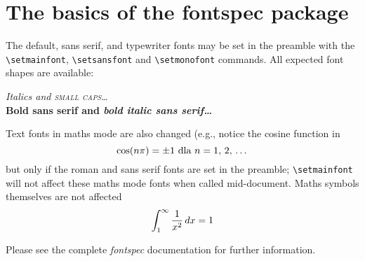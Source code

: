 \documentclass[a4paper,12pt]{article}
\begin{document}
\pagestyle{empty}

\section*{The basics of the \textsf{fontspec} package}

The default, sans serif, and typewriter fonts may be set in the preamble
with the \verb|\setmainfont|, \verb|\setsansfont| and \verb|\setmonofont|
commands.
All expected font shapes are available:
\begin{center}
  {\itshape Italics and \scshape small caps\dots}\\
  {\sffamily\bfseries Bold sans serif and \itshape bold italic sans serif\dots}
\end{center}
Text fonts in maths mode are also changed (e.g., notice the cosine function in
$$
  \cos(n\pi)=\pm 1 \hbox{ dla $n=1$, $2$, \ldots}
$$
but only if the roman and sans serif fonts are set in
the preamble; \verb|\setmainfont| will not affect these maths mode fonts when
called mid-document.
Maths symbols themselves are not affected
$$
  \int_1^\infty {1\over x^2}\,dx = 1
$$

Please see the complete \emph{fontspec} documentation for further information.
\end{document}
